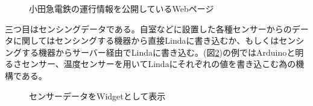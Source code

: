 \begin{figure}[htbp]
  \begin{minipage}{\hsize}
    \begin{center}
    \end{center}
    \caption{小田急電鉄の運行情報を公開しているWebページ}
    \label{fig:odakyu_page}
  \end{minipage}
\end{figure}

三つ目はセンシングデータである。自室などに設置した各種センサーからのデータに関してはセンシングする機器から直接Lindaに書き込むか、もしくはセンシングする機器からサーバー経由でLindaに書き込む。(図\ref{fig:sensor_widget})の例ではArduinoと明るさセンサー、温度センサーを用いてLindaにそれぞれの値を書き込こむ為の機構である。

\begin{figure}[htbp]
  \begin{minipage}{\hsize}
    \begin{center}
    \end{center}
    \caption{センサーデータをWidgetとして表示}
    \label{fig:sensor_widget}
  \end{minipage}
\end{figure}


